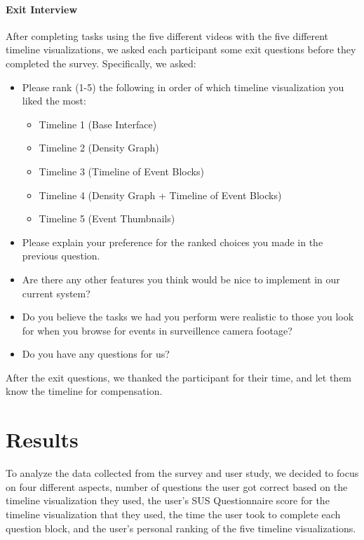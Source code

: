 \documentclass[doublespace,draft,nopageskip]{VTthesis} %
\begin{document}
\subsubsection{Exit Interview}
After completing tasks using the five different videos with the five different timeline visualizations, we asked each participant some exit questions before they completed the survey.  Specifically, we asked: 

\begin{itemize}
    \item Please rank (1-5) the following in order of which timeline visualization you liked the most:
    \begin{itemize}
        \item Timeline 1 (Base Interface)
        \item Timeline 2 (Density Graph)
        \item Timeline 3 (Timeline of Event Blocks)
        \item Timeline 4 (Density Graph + Timeline of Event Blocks)
        \item Timeline 5 (Event Thumbnails)
    \end{itemize}
    \item Please explain your preference for the ranked choices you made in the previous question.
    \item Are there any other features you think would be nice to implement in our current system?
    \item Do you believe the tasks we had you perform were realistic to those you look for when you browse for events in surveillence camera footage?
    \item Do you have any questions for us?
\end{itemize}

After the exit questions, we thanked the participant for their time, and let them know the timeline for compensation.

\chapter{Results} \label{ch:results}
To analyze the data collected from the survey and user study, we decided to focus on four different aspects, number of questions the user got correct based on the timeline visualization they used, the user's SUS Questionnaire score for the timeline visualization that they used, the time the user took to complete each question block, and the user's personal ranking of the five timeline visualizations.
\end{document}
